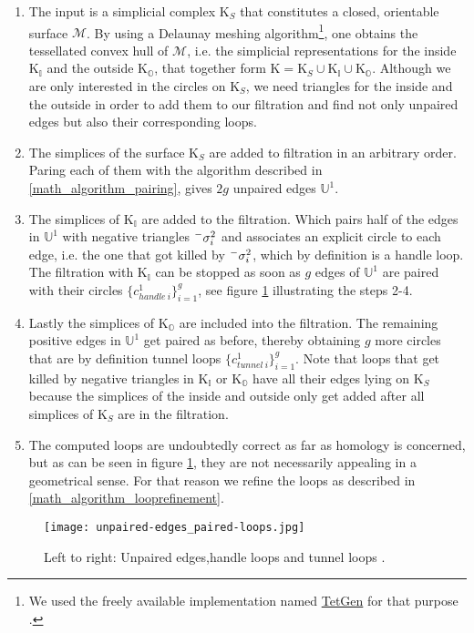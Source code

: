 \begin{enumerate}
\setlength{\itemsep}{0cm}
\setlength{\parskip}{0.15cm}
\item The input is a simplicial complex $\mathrm{K}_{S}$ that constitutes a closed, orientable surface $\mathcal{M}$. By using a Delaunay meshing algorithm\footnote{ We used the freely available implementation named \href{http://tetgen.berlios.de/}{TetGen} for that purpose \citep[cf.][]{Si2010}.}, one obtains the tessellated convex hull of $\mathcal{M}$, i.e. the simplicial representations for the inside $\mathrm{K}_{\mathbb{I}}$ and the outside $\mathrm{K}_{\mathbb{O}}$, that together form $\mathrm{K} = \mathrm{K}_{S} \cup \mathrm{K}_{\mathbb{I}} \cup \mathrm{K}_{\mathbb{O}}$. Although we are only interested in the circles on $\mathrm{K}_{S}$, we need triangles for the inside and the outside in order to add them to our filtration and find not only unpaired edges but also their corresponding loops.
\item The simplices of the surface $\mathrm{K}_{S}$ are added to filtration in an arbitrary order. Paring each of them with the algorithm described in \ref{math_algorithm_pairing}, gives $2g$ unpaired edges $\mathbb{U}^{1}$.
\item The simplices of $\mathrm{K}_{\mathbb{I}}$ are added to the filtration. Which pairs half of the edges in $\mathbb{U}^{1}$ with negative triangles $\Prefix^{-}{\sigma_{i}^{2}}$ and associates an explicit circle to each edge, i.e. the one that got killed by $\Prefix^{-}{\sigma_{i}^{2}}$, which by definition is a handle loop. The filtration with $\mathrm{K}_{\mathbb{I}}$ can be stopped as soon as $g$ edges of $\mathbb{U}^{1}$ are paired with their circles $\{c^{1}_{handle~i}\}^{g}_{i=1}$, see figure \ref{fig:unpaired-edges_paired-loops} illustrating the steps 2-4.
\item Lastly the simplices of $\mathrm{K}_{\mathbb{O}}$ are included into the filtration. The remaining positive edges in $\mathbb{U}^{1}$ get paired as before, thereby obtaining $g$ more circles that are by definition tunnel loops $\{c^{1}_{tunnel~i}\}^{g}_{i=1}$. Note that loops that get killed by negative triangles in $\mathrm{K}_{\mathbb{I}}$ or $\mathrm{K}_{\mathbb{O}}$ have all their edges lying on $\mathrm{K}_{S}$ because the simplices of the inside and outside only get added after all simplices of $\mathrm{K}_{S}$ are in the filtration.
\item The computed loops are undoubtedly correct as far as homology is concerned, but as can be seen in figure \ref{fig:unpaired-edges_paired-loops}, they are not necessarily appealing in a geometrical sense. For that reason we refine the loops as described in \ref{math_algorithm_looprefinement}.
\end{enumerate}
\begin{figure}[htb]
\centering
\texttt{[image: unpaired-edges\_paired-loops.jpg]}
\caption{Left to right: Unpaired edges,handle loops and tunnel loops \citep[][]{Dey2012}.}
\label{fig:unpaired-edges_paired-loops}
\bigskip
\end{figure}

